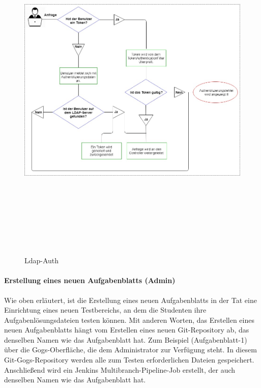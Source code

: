 \documentclass[a4paper,12pt,oneside]{book}
\begin{document}
\begin{figure}[h!]
	\begin{center}
		\includegraphics[width=15cm, height=17cm]{Ldap-Auth.jpg}
		\caption{Ldap-Auth } 
		\label{ Ldap-Auth } 
	\end{center}
\end{figure}

\paragraph{Erstellung eines neuen Aufgabenblatts (Admin)}
Wie oben erläutert, ist die Erstellung eines neuen Aufgabenblatts in der Tat eine Einrichtung eines neuen Testbereichs, an dem die Studenten ihre Aufgabenlösungsdateien testen können. Mit anderen Worten, das Erstellen eines neuen Aufgabenblatts hängt vom Erstellen eines neuen Git-Repository ab, das denselben Namen wie das Aufgabenblatt hat. Zum Beispiel (Aufgabenblatt-1) über die Gogs-Oberfläche, die dem Administrator zur Verfügung steht. In diesem Git-Gogs-Repository werden alle zum Testen erforderlichen Dateien gespeichert. Anschließend wird ein Jenkins Multibranch-Pipeline-Job erstellt, der auch denselben Namen wie das Aufgabenblatt hat.
\end{document}
